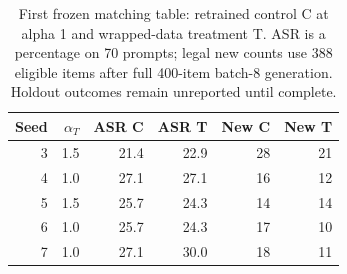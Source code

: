 \begin{table}[t]
\centering
\small
\setlength{\tabcolsep}{3pt}
\begin{tabular}{rrrrrr}
\toprule
Seed & $\alpha_T$ & ASR C & ASR T & New C & New T \\
\midrule
3 & 1.5 & 21.4 & 22.9 & 28 & 21 \\
4 & 1.0 & 27.1 & 27.1 & 16 & 12 \\
5 & 1.5 & 25.7 & 24.3 & 14 & 14 \\
6 & 1.0 & 25.7 & 24.3 & 17 & 10 \\
7 & 1.0 & 27.1 & 30.0 & 18 & 11 \\
\bottomrule
\end{tabular}
\caption{First frozen matching table: retrained control C at alpha 1 and wrapped-data treatment T. ASR is a percentage on 70 prompts; legal new counts use 388 eligible items after full 400-item batch-8 generation. Holdout outcomes remain unreported until complete.}
\label{tab:matching}
\end{table}
